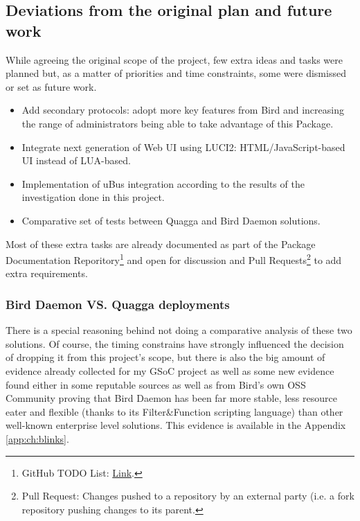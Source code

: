 \subsection{Deviations from the original plan and future  work}
While agreeing the original scope of the project, few extra ideas and tasks were planned but, as a matter of priorities and time constraints, some were dismissed or set as future work.

\begin{itemize}
    \item Add secondary protocols: adopt more key features from Bird and increasing the range of administrators being able to take advantage of this Package.
    \item Integrate next generation of Web UI using LUCI2: HTML/JavaScript-based UI instead of LUA-based.
    \item Implementation of uBus integration according to the results of the investigation done in this project.
    \item Comparative set of tests between Quagga and Bird Daemon solutions.
\end{itemize}

Most of these extra tasks are already documented as part of the Package Documentation Reporitory\footnote{GitHub TODO List: \href{https://github.com/eloicaso/bgp-bmx6-bird-docn/blob/master/EN/TODO.md}{Link}.} and open for discussion and Pull Requests\footnote{Pull Request: Changes pushed to a repository by an external party (i.e. a fork repository pushing changes to its parent.} to add extra requirements.

\subsubsection{Bird Daemon VS. Quagga deployments}
There is a special reasoning behind not doing a comparative analysis of these two solutions. Of course, the timing constrains have strongly influenced the decision of dropping it from this project's scope, but there is also the big amount of evidence already collected for my GSoC project as well as some new evidence found either in some reputable sources as well as from Bird's own OSS Community proving that Bird Daemon has been far more stable, less resource eater and flexible (thanks to its Filter\&Function scripting language) than other well-known enterprise level solutions. This evidence is available in the Appendix \ref{app:ch:blinks}.


